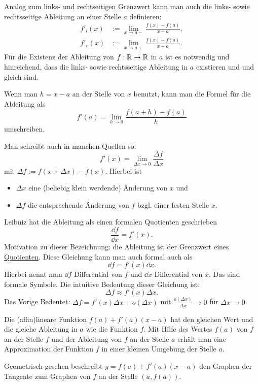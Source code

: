 \begin{bem}
	Analog zum links- und rechtseitigen Grenzwert kann man auch die links- sowie rechtsseitige Ableitung an einer Stelle $a$ definieren: 
	\begin{align*}
			f'_l(x) & := \lim_{x \to a-} \frac{f(x)- f(a)}{x-a}, 
			\\ f'_r(x) & := \lim_{x \to a+} \frac{f(x) - f(a)}{x-a}. 
	\end{align*} 
	Für die Existenz der Ableitung von $f : \mathbb{R} \to \mathbb{R}$ in $a$ ist es notwendig und hinreichend, dass die links- sowie rechtsseitige Ableitung in $a$ existieren und und gleich sind. 
\end{bem} 

\begin{bem}
	Wenn man $h= x-a$ an der Stelle von $x$ benutzt, kann  man die Formel für die Ableitung als 
	\[
		f'(a) = \lim_{h \to 0} \frac{f(a+h) - f(a)}{h}
	\]
	umschreiben. 
	
	Man schreibt auch in manchen Quellen so: 
	\[
		f'(x) = \lim_{\Delta x \to 0} \frac{\Delta f}{\Delta x} 
	\]
	mit $\Delta f := f(x + \Delta x) - f(x)$. Hierbei ist 
	\begin{itemize} 
		\item[] $\Delta x$ eine (beliebig klein werdende) Änderung von $x$ und 
		\item[] $\Delta f$ die entsprechende Änderung von $f$ bzgl. einer festen Stelle $x$. 
	\end{itemize} 
\end{bem} 

\begin{bem} 
	Leibniz hat die Ableitung als einen formalen Quotienten geschrieben
	\[
		\frac{\dd f}{\dd x} = f'(x). 
	\]
 	Motivation zu dieser Bezeichnung: die Ableitung ist der Grenzwert eines \underline{Quotienten}. Diese Gleichung kann man auch formal auch als 
 	\[
 		\dd f = f'(x) \dd x.
 	\]
 	Hierbei nennt man $\dd f$ Differential von $f$ und $\dd x$ Differential von $x$. Das sind formale Symbole. Die intuitive Bedeutung dieser Gleichung ist: 
 	\[
 		\Delta f \approx f'(x) \Delta x.
 	\]
 	Das Vorige Bedeutet: $\Delta f = f'(x) \Delta x + o(\Delta x)$ mit $\frac{o(\Delta x)}{\Delta x} \to 0$ für $\Delta x \to 0$.  
\end{bem} 

\begin{bem}
	Die (affin)lineare Funktion $f(a) + f'(a) (x-a)$ hat den gleichen Wert und die gleiche Ableitung in $a$ wie die Funktion $f$. Mit Hilfe des Wertes $f(a)$ von $f$ an der Stelle $f$ und der Ableitung von $f$ an der Stelle $a$ erhält man eine Approximation der Funktion $f$ in einer kleinen Umgebung der Stelle $a$. 
	
	Geometrisch gesehen beschreibt $y = f(a) + f'(a) (x-a)$ den Graphen der Tangente zum Graphen von $f$ an der Stelle $(a,f(a))$. 
\end{bem} 

